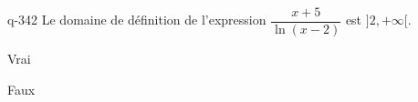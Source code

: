 \begin{truefalse}{q-342}
Le domaine de définition de l'expression $\dfrac{x+5}{\ln(x-2)}$ est $]2,+\infty[$.
\item Vrai
\item* Faux
\end{truefalse}

